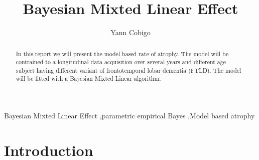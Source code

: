 \documentclass[final, paper=letter,5p,times,twocolumn]{elsarticle}
\theoremstyle{definition}
\begin{document}
\begin{frontmatter}

\title{Bayesian Mixted Linear Effect}

\author[label1]{Yann Cobigo}
\address[label1]{University of California, San Francisco | ucsf.edu}




\begin{abstract}
In this report we will present the model based rate of atrophy. The model will be contrained to a longitudinal data acquisition over several years and different age subject having different variant of frontotemporal lobar dementia (FTLD). The model will be fitted with a Bayesian Mixted Linear algorithm.
\end{abstract}

\begin{keyword}
Bayesian Mixted Linear Effect \sep parametric empirical Bayes \sep Model based atrophy
\end{keyword}

\end{frontmatter}


\section{Introduction}
\end{document}
